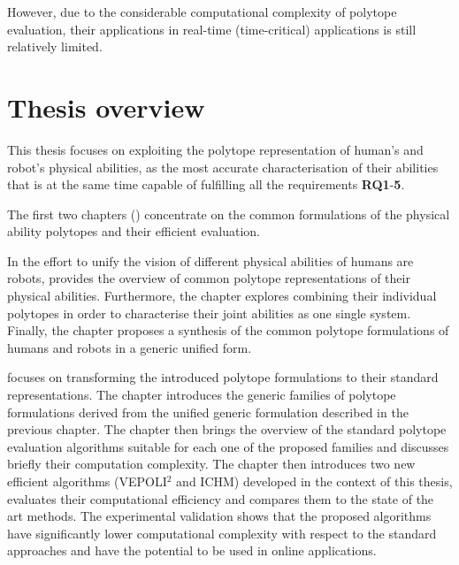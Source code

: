 However, due to the considerable computational complexity of polytope evaluation, their applications in real-time (time-critical) applications is still relatively limited. 

\section{Thesis overview}

This thesis focuses on exploiting the polytope representation of human's and robot's physical abilities, as the most accurate characterisation of their abilities that is at the same time capable of fulfilling all the requirements \textbf{RQ1}-\textbf{5}. 

The first two chapters () concentrate on the common formulations of the physical ability polytopes and their efficient evaluation.

In the effort to unify the vision of different physical abilities of humans are robots,  provides the overview of common polytope representations of their physical abilities. Furthermore, the chapter explores combining their individual polytopes in order to characterise their joint abilities as one single system.
Finally, the chapter proposes a synthesis of the common polytope formulations of humans and robots in a generic unified form.



 focuses on transforming the introduced polytope formulations to their standard representations. The chapter introduces the generic families of polytope formulations derived from the unified generic formulation described in the previous chapter. The chapter then brings the overview of the standard polytope evaluation algorithms suitable for each one of the proposed families and discusses briefly their computation complexity. The chapter then introduces two new efficient algorithms (VEPOLI$^2$ and ICHM) developed in the context of this thesis, evaluates their computational efficiency and compares them to the state of the art methods. The experimental validation shows that the proposed algorithms have significantly lower computational complexity with respect to the standard approaches and have the potential to be used in online applications.  


